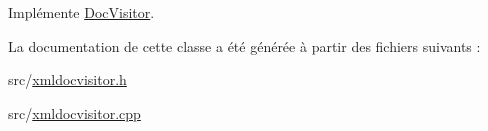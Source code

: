 Implémente \hyperlink{class_doc_visitor_a3545acbb5cf745cb1cb49aa237b53ead}{Doc\+Visitor}.



La documentation de cette classe a été générée à partir des fichiers suivants \+:\begin{DoxyCompactItemize}
\item 
src/\hyperlink{xmldocvisitor_8h}{xmldocvisitor.\+h}\item 
src/\hyperlink{xmldocvisitor_8cpp}{xmldocvisitor.\+cpp}\end{DoxyCompactItemize}
